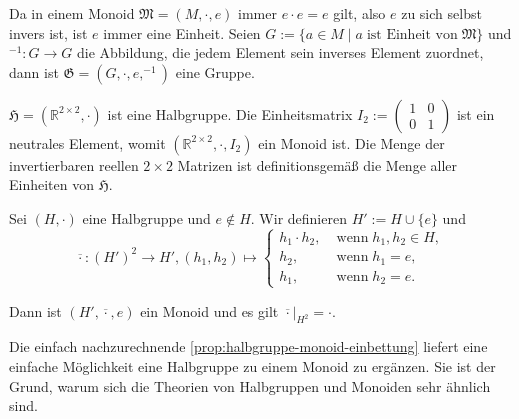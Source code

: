 \begin{remark}
    Da in einem Monoid $\mathfrak{M} = (M, \cdot, e)$ immer $e \cdot e = e$ gilt, also $e$ zu sich selbst invers ist, ist $e$ immer eine Einheit. Seien $G := \{a \in M \mid a \;\text{ist Einheit von}\; \mathfrak{M}\}$ und $^{-1}: G \to G$ die Abbildung, die jedem Element sein inverses Element zuordnet, dann ist $\mathfrak{G} = (G, \cdot, e, ^{-1})$ eine Gruppe.
\end{remark}

\begin{example}
    $\mathfrak{H} = (\mathbb{R}^{2\times 2}, \cdot)$ ist eine Halbgruppe. Die Einheitsmatrix $I_2 := \left(\begin{matrix}
        1 & 0 \\ 0 & 1
    \end{matrix}\right)$ ist ein neutrales Element, womit $(\mathbb{R}^{2\times 2}, \cdot, I_2)$ ein Monoid ist. Die Menge der invertierbaren reellen $2 \times 2$ Matrizen ist definitionsgemäß die Menge aller Einheiten von $\mathfrak{H}$.
\end{example}

\begin{proposition}\label{prop:halbgruppe-monoid-einbettung}
    Sei $(H, \cdot)$ eine Halbgruppe und $e \not\in H$. Wir definieren $H' := H \cup \{e\}$ und $$\overline{\cdot}: (H')^2 \to H', (h_1, h_2) \mapsto \left\{\begin{array}{ll}
        h_1 \cdot h_2, & \;\text{wenn}\; h_1, h_2 \in H, \\
        h_2, & \;\text{wenn}\; h_1 = e, \\
        h_1, & \;\text{wenn}\; h_2 = e.
    \end{array}\right.$$

    Dann ist $(H', \overline{\cdot}, e)$ ein Monoid und es gilt $\overline{\cdot}\vert_{H^2} = \cdot$.
\end{proposition}

\begin{remark}
    Die einfach nachzurechnende \cref{prop:halbgruppe-monoid-einbettung} liefert eine einfache Möglichkeit eine Halbgruppe zu einem Monoid zu ergänzen. Sie ist der Grund, warum sich die Theorien von Halbgruppen und Monoiden sehr ähnlich sind.
\end{remark}

